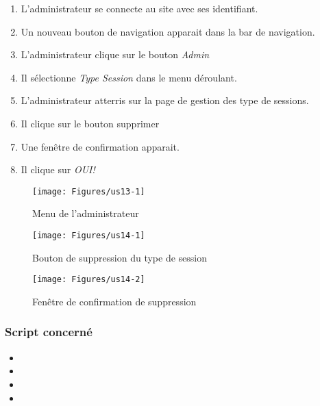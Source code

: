 \begin{enumerate}
	\item L'administrateur se connecte au site avec ses identifiant. 
	\item Un nouveau bouton de navigation apparait dans la bar de navigation. 
	\item L'administrateur clique sur le bouton \textit{Admin}
	\item Il sélectionne \textit{Type Session} dans le menu déroulant. 
	\item L'administrateur atterris sur la page de gestion des type de sessions. 
	\item Il clique sur le bouton supprimer
	\item Une fenêtre de confirmation apparait. 
	\item Il clique sur \textit{OUI!} 
\end{enumerate}


\begin{figure}[h]
	\texttt{[image: Figures/us13-1]}
	\caption{Menu de l'administrateur}
\end{figure}

\vspace{\baselineskip}
\begin{figure}[h]
	\texttt{[image: Figures/us14-1]}
	\caption{Bouton de suppression du type de session}
\end{figure}

\newpage
\begin{figure}[h]
	\texttt{[image: Figures/us14-2]}
	\caption{Fenêtre de confirmation de suppression}
\end{figure}

\subsubsection{Script concerné}
	\begin{itemize}
		\item {}
		\item {}
		\item {}
		\item {}
	\end{itemize}
